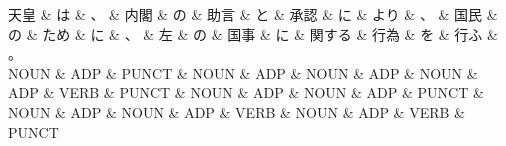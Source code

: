 \documentclass[tikz,border=5pt]{standalone}
\begin{document}
\normalsize
\begin{dependency}[edge unit distance=10.9pt]
    \begin{deptext}[column sep=1em]
        天皇 \& は \& 、 \& 内閣 \& の \& 助言 \& と \& 承認 \& に \& より \& 、 \& 国民 \& の \& ため \& に \& 、 \& 左 \& の \& 国事 \& に \& 関する \& 行為 \& を \& 行ふ \& 。\\
        NOUN \& ADP \& PUNCT \& NOUN \& ADP \& NOUN \& ADP \& NOUN \& ADP \& VERB \& PUNCT \& NOUN \& ADP \& NOUN \& ADP \& PUNCT \& NOUN \& ADP \& NOUN \& ADP \& VERB \& NOUN \& ADP \& VERB \& PUNCT\\
    \end{deptext}
\end{dependency}
\end{document}
